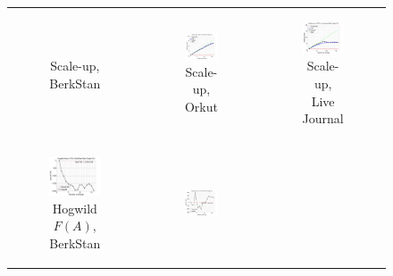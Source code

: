 \documentclass{article} %
\begin{document}
\begin{figure}[ht]
\begin{tabular}{ccc}
\begin{subfigure}[b]{0.31\textwidth}
			\caption{Scale-up, BerkStan}
			\label{fig:scaleup_webberkstan_maxgraphcut}
	  \end{subfigure} &
	  \begin{subfigure}[b]{0.31\textwidth}
	  	\includegraphics[width=150pt]{images/scaleup_orkut_maxgraphcut.png}
			\caption{Scale-up, Orkut}
			\label{fig:scaleup_orkut_maxgraphcut}
	  \end{subfigure} &
	  \begin{subfigure}[b]{0.31\textwidth}
	  	\includegraphics[width=150pt]{images/scaleup_livejournal_maxgraphcut.png}
			\caption{Scale-up, Live Journal}
			\label{fig:scaleup_livejournal_maxgraphcut}
	  \end{subfigure} \\
	  \begin{subfigure}[b]{0.31\textwidth}
	  	\includegraphics[width=150pt]{images/diffFA_Hogwild_webberkstan_maxgraphcut.png}
			\caption{Hogwild $F(A)$, BerkStan}
			\label{fig:diffFA_Hogwild_webberkstan_maxgraphcut}
	  \end{subfigure} &
	  \begin{subfigure}[b]{0.31\textwidth}
	  	\includegraphics[width=150pt]{images/diffFA_Hogwild_orkut_maxgraphcut.png}

\end{subfigure}
\end{tabular}
\end{figure}
\end{document}
